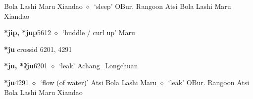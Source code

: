 \begin{list}{}{\leftmargin=1.5em \itemindent=-1.5em}
\hspace{1ex}
         Bola 
\hspace{1ex}
         Lashi 
\hspace{1ex}
         Maru 
\hspace{1ex}
         Xiandao 
\hspace{1ex}
         $\diamond$~`sleep'
         OBur. 
\hspace{1ex}
         Rangoon 
\hspace{1ex}
         Atsi 
\hspace{1ex}
         Bola 
\hspace{1ex}
         Lashi 
\hspace{1ex}
         Maru 
\hspace{1ex}
         Xiandao 
  \item {\footnotesize \textbf{*jip, *jup}}{\tiny 5612}
\hspace{1ex}
         $\diamond$~`huddle / curl up'
         Maru 
  \end{list}
\item
\textbf{*ju}
  {\tiny crossid 6201, 4291}
  \begin{list}{}{\leftmargin=1.5em \itemindent=-1.5em}
  \item {\footnotesize \textbf{*ju, *ʔju}}{\tiny 6201}
         $\diamond$~`leak'
         Achang\_Longchuan 
  \item {\footnotesize \textbf{*ju}}{\tiny 4291}
\hspace{1ex}
         $\diamond$~`flow (of water)'
         Atsi 
\hspace{1ex}
         Bola 
\hspace{1ex}
         Lashi 
\hspace{1ex}
         Maru 
\hspace{1ex}
         $\diamond$~`leak'
         OBur. 
\hspace{1ex}
         Rangoon 
\hspace{1ex}
         Atsi 
\hspace{1ex}
         Bola 
\hspace{1ex}
         Lashi 
\hspace{1ex}
         Maru 
\hspace{1ex}
         Xiandao 
  \end{list}
